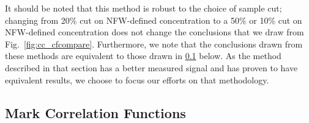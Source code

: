 \documentclass[usenatbib]{mnras}
\begin{document}

It should be noted that this method is robust to the choice of sample cut;
changing from 20\% cut on NFW-defined concentration to a 50\% or 10\% cut on
NFW-defined concentration does not change the conclusions that we draw from
Fig.~\ref{fig:cc_cfcompare}. Furthermore, we note that the conclusions drawn
from these methods are equivalent to those drawn in \ref{sub:mcfresults}
below. As the method described in that section has a better measured signal
and has proven to have equivalent results, we choose to focus our efforts on
that methodology.

\subsection{Mark Correlation Functions}
\label{sub:mcfresults}
\end{document}
